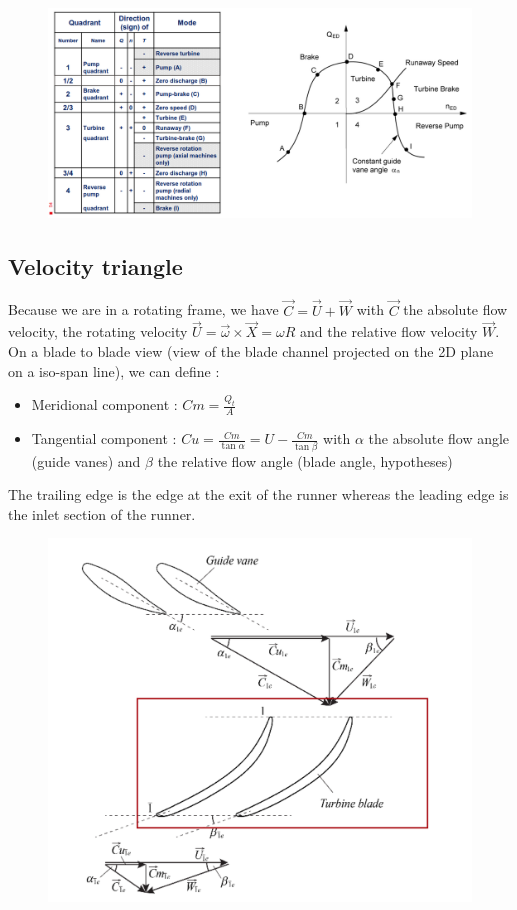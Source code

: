 \documentclass[../main.tex]{subfiles}
\begin{document}
\begin{figure}[hbt!]
    \centering
    \includegraphics[width=0.8\linewidth]{IMAGES/Hydraulic/Screenshot from 2024-09-28 13-13-11.png}
\end{figure}

\subsection{Velocity triangle}

Because we are in a rotating frame, we have $\Vec{C} = \vec{U}+ \vec{W}$ with $\vec{C}$ the absolute flow velocity, the rotating velocity $\vec{U} = \vec{\omega} \times \vec{X} = \omega R$ and the relative flow velocity $\vec{W}$.\\

On a blade to blade view (view of the blade channel projected on the 2D plane on a iso-span line), we can define : \begin{itemize}
    \item Meridional component : $Cm = \frac{Q_t}{A}$
    \item Tangential component : $Cu = \frac{Cm}{\tan \alpha} = U- \frac{Cm}{\tan \beta}$ with $\alpha$ the absolute flow angle (guide vanes) and $\beta$ the relative flow angle (blade angle, hypotheses)
\end{itemize}

The trailing edge is the edge at the exit of the runner whereas the leading edge is the inlet section of the runner.

\begin{figure}[hbt!]
    \centering
    \includegraphics[width=0.8\linewidth]{IMAGES/Hydraulic/PNG image.png}
\end{figure}
\end{document}
